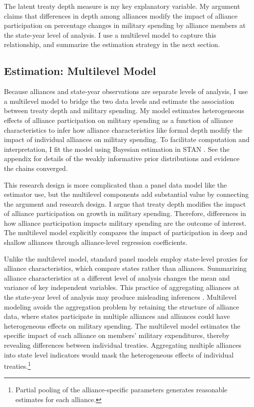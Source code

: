 \documentclass[12pt]{article}
\begin{document}
The latent treaty depth measure is my key explanatory variable. 
My argument claims that differences in depth among alliances modify the impact of alliance participation on percentage changes in military spending by alliance members at the state-year level of analysis. 
I use a multilevel model to capture this relationship, and summarize the estimation strategy in the next section. 


\subsection{Estimation: Multilevel Model} 


Because alliances and state-year observations are separate levels of analysis, I use a multilevel model to bridge the two data levels and estimate the association between treaty depth and military spending. 
My model estimates heterogeneous effects of alliance participation on military spending as a function of alliance characteristics to infer how alliance characteristics like formal depth modify the impact of individual alliances on military spending.
To facilitate computation and interpretation, I fit the model using Bayesian estimation in STAN \citep{Carpenteretal2016}. 
See the appendix for details of the weakly informative prior distributions and evidence the chains converged.


This research design is more complicated than a panel data model like the estimator \citet{DigiuseppePoast2018} use, but the multilevel components add substantial value by connecting the argument and research design.
I argue that treaty depth modifies the impact of alliance participation on growth in military spending. 
Therefore, differences in how alliance participation impacts military spending are the outcome of interest.  
The multilevel model explicitly compares the impact of participation in deep and shallow alliances through alliance-level regression coefficients. 


Unlike the multilevel model, standard panel models employ state-level proxies for alliance characteristics, which compare states rather than alliances.
Summarizing alliance characteristics at a different level of analysis changes the mean and variance of key independent variables. 
This practice of aggregating alliances at the state-year level of analysis may produce misleading inferences \citep[pg. 356]{McElreath2016}.
Multilevel modeling avoids the aggregation problem by retaining the structure of alliance data, where states participate in multiple alliances and alliances could have heterogeneous effects on military spending.
The multilevel model estimates the specific impact of each alliance on members' military expenditures, thereby revealing differences between individual treaties. 
Aggregating multiple alliances into state level indicators would mask the heterogeneous effects of individual treaties.\footnote{Partial pooling of the alliance-specific parameters generates reasonable estimates for each alliance.} 
\end{document}
